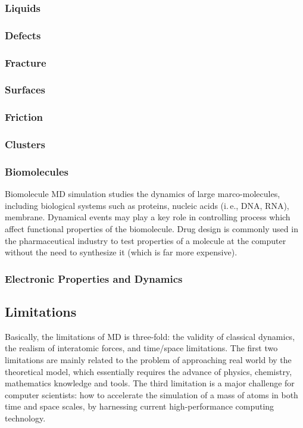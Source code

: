 \documentclass[a4paper,10pt,technote,compsoc,onecolumn]{IEEEtran}
\newcommand{\ie}{i.\,e., }
\numberwithin{equation}{section}
\begin{document}
\subsubsection{Liquids}

\subsubsection{Defects}

\subsubsection{Fracture}

\subsubsection{Surfaces}

\subsubsection{Friction}

\subsubsection{Clusters}

\subsubsection{Biomolecules}
Biomolecule \ac{MD} simulation studies the dynamics of large marco-molecules,
including biological systems such as proteins, nucleic acids (\ie \acs{DNA},
\acs{RNA}), membrane. Dynamical events may play a key role in controlling
process which affect functional properties of the biomolecule. Drug design is
commonly used in the pharmaceutical industry to test properties of a molecule
at the computer without the need to synthesize it (which is far more
expensive).

\subsubsection{Electronic Properties and Dynamics}

\subsection{Limitations}
Basically, the limitations of \ac{MD} is three-fold: the validity of classical
dynamics, the realism of interatomic forces, and time/space limitations. The
first two limitations are mainly related to the problem of approaching real
world by the theoretical model, which essentially requires the advance of
physics, chemistry, mathematics knowledge and tools. The third limitation is a
major challenge for computer scientists: how to accelerate the simulation of a
mass of atoms in both time and space scales, by harnessing current
high-performance computing technology.
\end{document}
